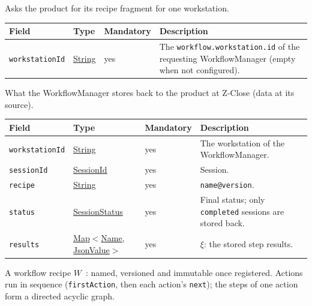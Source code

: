 \documentclass[a4paper]{arrowhead}
\newcommand{\mref}[1]{{\textcolor{ArrowheadPurple}{\hyperref[sec:model:#1]{#1}}}}
\newcommand{\pref}[1]{{\textcolor{ArrowheadGrey}{\hyperref[sec:model:primitives:#1]{#1}}}}
\begin{document}
Asks the product for its recipe fragment for one workstation.

{\small
\begin{longtable}{|p{3.7cm}|p{4.2cm}|p{1.6cm}|p{6.3cm}|}

\hline
\rowcolor{gray!33} Field & Type & Mandatory & Description \\ \hline
\endhead
\texttt{workstationId} & \pref{String} & yes & The \texttt{workflow.\allowbreak{}workstation.\allowbreak{}id} of the requesting WorkflowManager (empty when not configured). \\ \hline
\end{longtable}
}

What the WorkflowManager stores back to the product at Z-Close (data at its source).

{\small
\begin{longtable}{|p{3.7cm}|p{4.2cm}|p{1.6cm}|p{6.3cm}|}

\hline
\rowcolor{gray!33} Field & Type & Mandatory & Description \\ \hline
\endhead
\texttt{workstationId} & \pref{String} & yes & The workstation of the WorkflowManager. \\ \hline
\texttt{sessionId} & \pref{SessionId} & yes & Session. \\ \hline
\texttt{recipe} & \pref{String} & yes & \texttt{name@version}. \\ \hline
\texttt{status} & \mref{SessionStatus} & yes & Final status; only \texttt{completed} sessions are stored back. \\ \hline
\texttt{results} & \pref{Map}$<$\pref{Name}, \pref{JsonValue}$>$ & yes & $\xi$: the stored step results. \\ \hline
\end{longtable}
}

A workflow recipe $W$~\cite{varga2026}: named, versioned and immutable once registered. Actions run in sequence (\texttt{firstAction}, then each action's \texttt{next}); the steps of one action form a directed acyclic graph.
\end{document}
